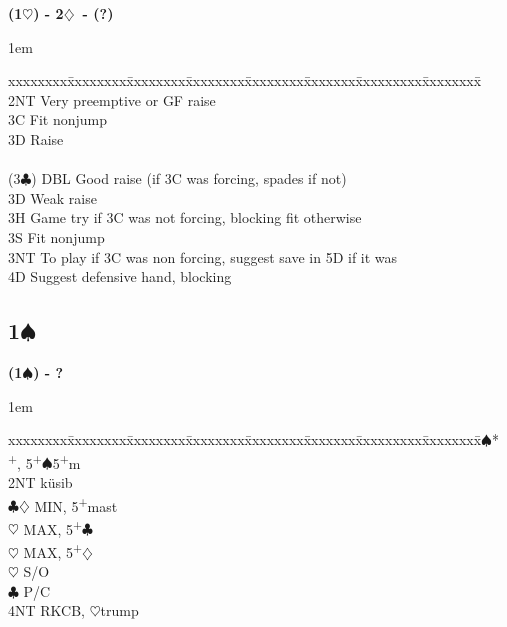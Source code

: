 \documentclass[10pt]{article}
\renewcommand{\c}{$\clubsuit$}
\renewcommand{\d}{$\diamondsuit$}
\newcommand{\h}{$\heartsuit$}
\newcommand{\s}{$\spadesuit$}
\newcommand{\p}{\textsuperscript{+}}
\newenvironment{bidtable}[1][]
{\textbf{#1}
  \begin{adjustwidth}{1em}{}
    \addvspace{2pt}
    \begin{tabbing}
      xxxxxxxx\=xxxxxxxx\=xxxxxxxx\=xxxxxxxx\=xxxxxxxx\=xxxxxxx\=xxxxxxxxx\=xxxxxxxx\=\kill}
{\end{tabbing}\end{adjustwidth}\bigskip}%
\newcommand{\pdfs}{\texorpdfstring{\s{}}{S}}
\begin{document}
\begin{bidtable}[(1\h) - 2\d\ - (?)]
       \> 2NT  \> Very preemptive or GF raise                                 \\
       \> 3C   \> Fit nonjump                                                 \\
       \> 3D   \> Raise                                                       \\
                                                                              \\
(3\c)  \> DBL  \> Good raise (if 3C was forcing, spades if not)               \\
       \> 3D   \> Weak raise                                                  \\
       \> 3H   \> Game try if 3C was not forcing, blocking fit otherwise      \\
       \> 3S   \> Fit nonjump                                                 \\
       \> 3NT  \> To play if 3C was non forcing, suggest save in 5D if it was \\
       \> 4D   \> Suggest defensive hand, blocking
\end{bidtable}



\subsection{1\pdfs}

\begin{bidtable}[(1\s) - ?]
2\s* {}\p, 5\p\s 5\p m             \\
     \> 2NT \> küsib                  \\
     \>     \c\d \> MIN, 5\p mast \\
     \>     \h   \> MAX, 5\p\c    \\
     \>     \h   \> MAX, 5\p\d    \\
     \h \> S/O                    \\
     \c \> P/C                    \\
     \> 4NT \> RKCB, \h trump
\end{bidtable}
\end{document}
